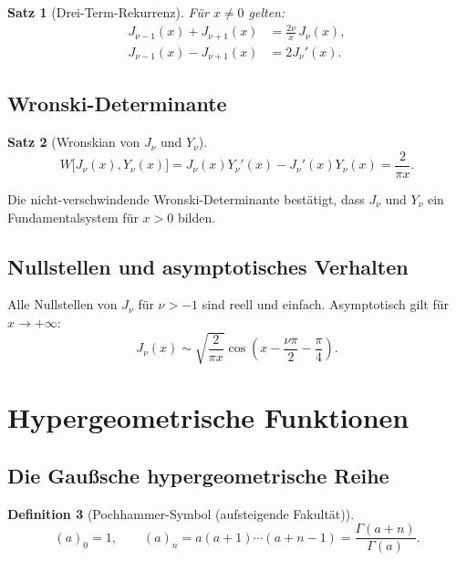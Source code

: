 \documentclass[12pt,a4paper]{amsart}
\newtheorem{theorem}{Satz}[section]
\theoremstyle{definition}
\newtheorem{definition}[theorem]{Definition}
\begin{document}
\begin{theorem}[Drei-Term-Rekurrenz]\label{thm:bessel_recur_de}
Für \(x \neq 0\) gelten:
\begin{align}
  J_{\nu-1}(x) + J_{\nu+1}(x) &= \frac{2\nu}{x}\,J_\nu(x),\label{eq:bessel_rec1_de}\\
  J_{\nu-1}(x) - J_{\nu+1}(x) &= 2J_\nu'(x).\label{eq:bessel_rec2_de}
\end{align}
\end{theorem}

\subsection{Wronski-Determinante}

\begin{theorem}[Wronskian von \(J_\nu\) und \(Y_\nu\)]
\[
  W\bigl[J_\nu(x), Y_\nu(x)\bigr]
  = J_\nu(x)Y_\nu'(x) - J_\nu'(x)Y_\nu(x)
  = \frac{2}{\pi x}.
\]
\end{theorem}

Die nicht-verschwindende Wronski-Determinante bestätigt, dass \(J_\nu\) und \(Y_\nu\)
ein Fundamentalsystem für \(x > 0\) bilden.

\subsection{Nullstellen und asymptotisches Verhalten}

Alle Nullstellen von \(J_\nu\) für \(\nu > -1\) sind reell und einfach.
Asymptotisch gilt für \(x \to +\infty\):
\[
  J_\nu(x) \sim \sqrt{\frac{2}{\pi x}}\cos\!\left(x - \frac{\nu\pi}{2} - \frac{\pi}{4}\right).
\]

\section{Hypergeometrische Funktionen}
\label{sec:hypergeometric}

\subsection{Die Gaußsche hypergeometrische Reihe}

\begin{definition}[Pochhammer-Symbol (aufsteigende Fakultät)]
\[
  (a)_0 = 1, \qquad (a)_n = a(a+1)\cdots(a+n-1) = \frac{\Gamma(a+n)}{\Gamma(a)}.
\]
\end{definition}
\end{document}

